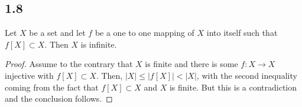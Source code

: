\subsection*{1.8} Let $X$ be a set and let $f$ be a one to one mapping of $X$ into itself such that $f[X] \subset X$. Then $X$ is infinite.

\begin{proof}
Assume to the contrary that $X$ is finite and there is some $f: X \rightarrow X$ injective with $f[X] \subset X$. Then, $|X| \leq |f[X]| < |X|$, with the second inequality coming from the fact that $f[X] \subset X$ and $X$ is finite. But this is a contradiction and the conclusion follows.
\end{proof}

